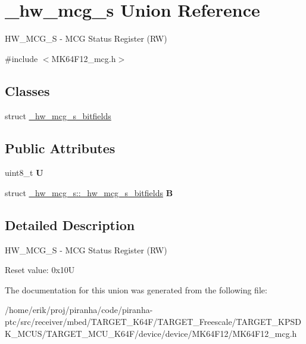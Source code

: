 \hypertarget{union__hw__mcg__s}{}\section{\+\_\+hw\+\_\+mcg\+\_\+s Union Reference}
\label{union__hw__mcg__s}


H\+W\+\_\+\+M\+C\+G\+\_\+S -\/ M\+CG Status Register (RW)  




{\ttfamily \#include $<$M\+K64\+F12\+\_\+mcg.\+h$>$}

\subsection*{Classes}
\begin{DoxyCompactItemize}
\item 
struct \hyperlink{struct__hw__mcg__s_1_1__hw__mcg__s__bitfields}{\+\_\+hw\+\_\+mcg\+\_\+s\+\_\+bitfields}
\end{DoxyCompactItemize}
\subsection*{Public Attributes}
\begin{DoxyCompactItemize}
\item 
uint8\+\_\+t {\bfseries U}\hypertarget{union__hw__mcg__s_a60f18b66ad7cb8fd21342953ecce2541}{}\label{union__hw__mcg__s_a60f18b66ad7cb8fd21342953ecce2541}

\item 
struct \hyperlink{struct__hw__mcg__s_1_1__hw__mcg__s__bitfields}{\+\_\+hw\+\_\+mcg\+\_\+s\+::\+\_\+hw\+\_\+mcg\+\_\+s\+\_\+bitfields} {\bfseries B}\hypertarget{union__hw__mcg__s_ae946160e1996b1dcdcfde4d0454ba979}{}\label{union__hw__mcg__s_ae946160e1996b1dcdcfde4d0454ba979}

\end{DoxyCompactItemize}


\subsection{Detailed Description}
H\+W\+\_\+\+M\+C\+G\+\_\+S -\/ M\+CG Status Register (RW) 

Reset value\+: 0x10U 

The documentation for this union was generated from the following file\+:\begin{DoxyCompactItemize}
\item 
/home/erik/proj/piranha/code/piranha-\/ptc/src/receiver/mbed/\+T\+A\+R\+G\+E\+T\+\_\+\+K64\+F/\+T\+A\+R\+G\+E\+T\+\_\+\+Freescale/\+T\+A\+R\+G\+E\+T\+\_\+\+K\+P\+S\+D\+K\+\_\+\+M\+C\+U\+S/\+T\+A\+R\+G\+E\+T\+\_\+\+M\+C\+U\+\_\+\+K64\+F/device/device/\+M\+K64\+F12/M\+K64\+F12\+\_\+mcg.\+h\end{DoxyCompactItemize}
